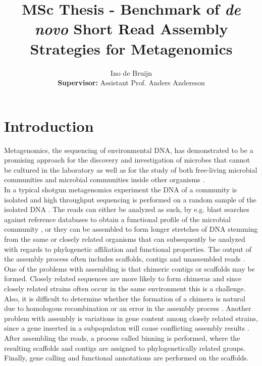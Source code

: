 \documentclass[a4paper,12pt]{report}
\begin{document}


\title{MSc Thesis - Benchmark of {\em de novo} Short Read Assembly Strategies for Metagenomics}
\author{Ino de Bruijn\\ {\bf Supervisor:} Assistant Prof. Anders Andersson}

\maketitle

\tableofcontents

\chapter{Introduction}
Metagenomics, the sequencing of environmental DNA, has demonstrated to be a
promising approach for the discovery and investigation of microbes that cannot
be cultured in the laboratory \cite{Eisen17355177} as well as for the study of
both free-living microbial communities \cite{Andersson18497291} and microbial
communities inside other organisms \cite{Qin20203603,Hess21273488}.\\


In a typical shotgun metagenomics experiment the DNA of a community is isolated
and high throughput sequencing is performed on a random sample of the isolated
DNA \cite{Morgan20419134}. The reads can either be analyzed as such, by e.g.
blast searches against reference databases to obtain a functional profile of
the microbial community \cite{Tringe15845853}, or they can be assembled to form
longer stretches of DNA stemming from the same or closely related organisms
that can subsequently be analyzed with regards to phylogenetic affiliation and
functional properties. The output of the assembly process often includes
scaffolds, contigs and unassembled reads \cite{Mavromatis17468765}. One of the
problems with assembling is that chimeric contigs or scaffolds may be formed.
Closely related sequences are more likely to form chimeras and since closely
related strains often occur in the same environment this is a challenge. Also,
it is difficult to determine whether the formation of a chimera is natural due
to homologous recombination or an error in the assembly process
\cite{Tyson14961025}. Another problem with assembly is variations in gene
content among closely related strains, since a gene inserted in a subpopulaton
will cause conflicting assembly results \cite{Hallam17114289}. After assembling
the reads, a process called binning is performed, where the resulting scaffolds
and contigs are assigned to phylogenetically related groups. Finally, gene
calling and functional annotations are performed on the scaffolds.\\
\end{document}

